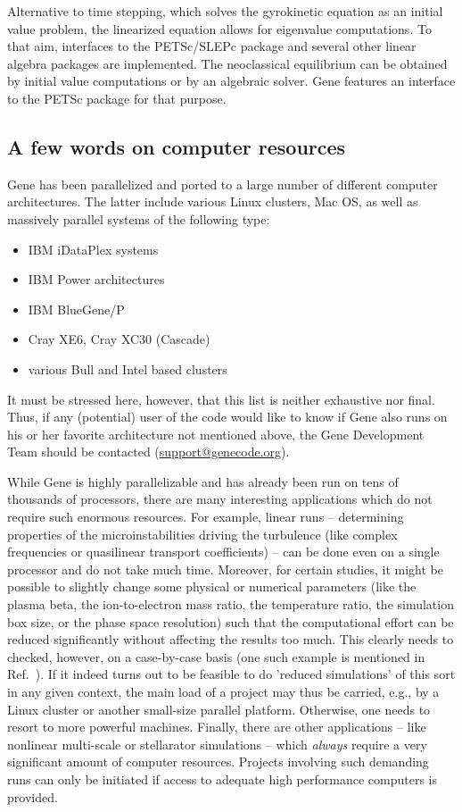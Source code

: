 \documentclass[12pt]{article}
\begin{document}
Alternative to time stepping, which solves the gyrokinetic equation as an initial value problem,
the linearized equation allows for eigenvalue computations. To that aim, interfaces
to the PETSc/SLEPc package and several other linear algebra packages are implemented.
The neoclassical equilibrium can be obtained by initial value computations or by an algebraic solver.
{\sc Gene} features an interface to the PETSc package for that purpose.

\subsection{A few words on computer resources}\label{sec5}

{\sc Gene} has been parallelized and ported to a large number of different computer architectures.
The latter include various Linux clusters, Mac OS, as well as massively parallel systems of the following
type:
\begin{itemize}
\item IBM iDataPlex systems
\item IBM Power architectures
\item IBM BlueGene/P
\item Cray XE6, Cray XC30 (Cascade)
\item various Bull and Intel based clusters
\end{itemize}
It must be stressed here, however, that this list is neither exhaustive nor final. Thus, if any
(potential) user of the code would like to know if {\sc Gene} also runs on his or her favorite
architecture not mentioned above, the {\sc Gene} Development Team should be contacted
(\href{mailto:support@genecode.org}{support@genecode.org}).

While {\sc Gene} is highly parallelizable and has already been run on tens of thousands of
processors, there are many interesting applications which do not require such enormous resources.
For example, linear runs -- determining properties of the microinstabilities driving the turbulence
(like complex frequencies or quasilinear transport coefficients) -- can be done even on a single
processor and do not take much time. Moreover, for certain studies, it might be possible to slightly
change some physical or numerical parameters (like the plasma beta, the ion-to-electron mass ratio,
the temperature ratio, the simulation box size, or the phase space resolution) such that the
computational effort can be reduced significantly without affecting the results too much. This
clearly needs to checked, however, on a case-by-case basis (one such example is mentioned in
Ref.~\cite{gene2}). If it indeed turns out to be feasible to do 'reduced simulations' of this sort
in any given context, the main load of a project may thus be carried, e.g., by a Linux cluster
or another small-size parallel platform. Otherwise, one needs to resort to more powerful machines.
Finally, there are other applications -- like nonlinear multi-scale or stellarator simulations --
which {\em always} require a very significant amount of computer resources. Projects involving such
demanding runs can only be initiated if access to adequate high performance computers is provided.
\end{document}
